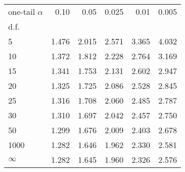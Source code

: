 \documentclass{standalone}
\begin{document}
\begin{tabular}{lrrrrr}
\toprule
one-tail $\alpha$ &   0.10 &   0.05 &   0.025 &   0.01 &   0.005 \\
d.f. &        &        &        &        &        \\
\midrule
5    &  1.476 &  2.015 &  2.571 &  3.365 &  4.032 \\
10   &  1.372 &  1.812 &  2.228 &  2.764 &  3.169 \\
15   &  1.341 &  1.753 &  2.131 &  2.602 &  2.947 \\
20   &  1.325 &  1.725 &  2.086 &  2.528 &  2.845 \\
25   &  1.316 &  1.708 &  2.060 &  2.485 &  2.787 \\
30   &  1.310 &  1.697 &  2.042 &  2.457 &  2.750 \\
50   &  1.299 &  1.676 &  2.009 &  2.403 &  2.678 \\
1000 &  1.282 &  1.646 &  1.962 &  2.330 &  2.581 \\
$\infty$ & 1.282 & 1.645 & 1.960 & 2.326 & 2.576 \\
\bottomrule
\end{tabular}
\end{document}
